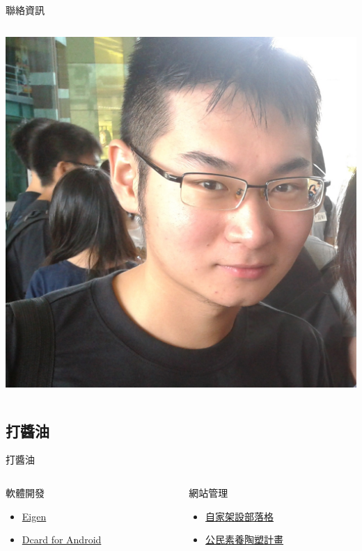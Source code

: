 \begin{frame}{聯絡資訊}
\begin{columns}[onlytextwidth]
        \begin{column}{0.4\textwidth}
            \includegraphics[width=0.9\columnwidth]{Introduction/sticker.jpg}
        \end{column}
    \end{columns}
\end{frame}

\subsection{打醬油}
\begin{frame}{打醬油}
    \begin{columns}[onlytextwidth]
        \begin{column}{0.5\textwidth}
            軟體開發
            \begin{itemize}
                \item \href{http://eigen.tuxfamily.org/}{Eigen}
                \item \href{https://play.google.com/store/apps/details?id=com.sparkslab.dcardreader}{Dcard for Android}
            \end{itemize}
        \end{column}

        \begin{column}{0.5\textwidth}
            網站管理
            \begin{itemize}
                \item \href{http://jdh8.org/}{自家架設部落格}
                \item \href{http://civics.tmu.edu.tw/}{公民素養陶塑計畫} 
            \end{itemize}
        \end{column}
    \end{columns}
\end{frame}


